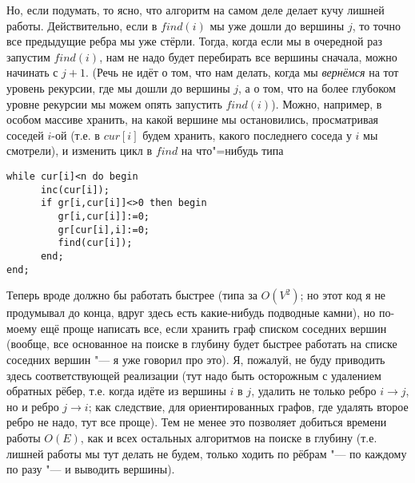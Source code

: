 Но, если подумать, то ясно, что алгоритм на самом деле делает кучу лишней работы. Действительно, 
если в $find(i)$ мы уже дошли до вершины $j$, то точно все предыдущие ребра мы уже стёрли. Тогда, 
когда если мы в очередной раз запустим $find(i)$, нам не надо будет перебирать все вершины сначала, 
можно начинать с $j+1$. (Речь не идёт о том, что нам делать, когда мы \textit{вернёмся} на тот 
уровень рекурсии, где мы дошли до вершины $j$, а о том, что на более глубоком уровне рекурсии мы 
можем опять запустить $find(i)$). Можно, например, в особом массиве хранить, на какой вершине мы 
остановились, просматривая соседей $i$-ой (т.е. в $cur[i]$ будем хранить, какого последнего соседа 
у $i$ мы смотрели), и изменить цикл в $find$ на что"=нибудь типа
\begin{codesampleo}\begin{verbatim}
while cur[i]<n do begin
      inc(cur[i]);
      if gr[i,cur[i]]<>0 then begin
         gr[i,cur[i]]:=0;
         gr[cur[i],i]:=0;
         find(cur[i]);
      end;
end;
\end{verbatim}
\end{codesampleo}

Теперь вроде должно бы работать быстрее (типа за $O(V^2)$; но этот код я не продумывал до конца,
вдруг здесь есть какие-нибудь подводные камни), но по-моему ещё проще написать все, если хранить 
граф списком соседних вершин (вообще, все основанное на поиске в глубину будет быстрее работать 
на списке соседних вершин "--- я уже говорил про это). Я, пожалуй, не буду приводить здесь 
соответствующей реализации (тут надо быть осторожным с удалением обратных рёбер, т.е. когда идёте 
из вершины $i$ в $j$, удалить не только ребро $i\to j$, но и ребро $j\to i$; как следствие, для 
ориентированных графов, где удалять второе ребро не надо, тут все проще). Тем не менее это 
позволяет добиться времени работы $O(E)$, как и всех остальных алгоритмов на поиске в глубину (т.е. 
лишней работы мы тут делать не будем, только ходить по рёбрам "--- по каждому по разу "--- и 
выводить вершины).